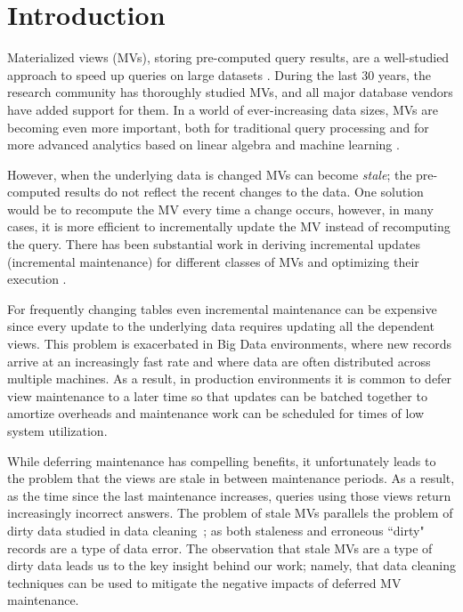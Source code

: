 \vspace{-0.5em}
\section{Introduction}
Materialized views (MVs), storing pre-computed query results, are a well-studied approach to speed up queries on large datasets \cite{LarsonY85, gupta1995maintenance, chirkova2011materialized, halevy2001answering}.
During the last 30 years, the research community has thoroughly studied MVs, and all major database vendors have added support for them.
In a world of ever-increasing data sizes, MVs are becoming even more important, both for traditional query processing and for more advanced analytics based on linear algebra and machine learning \cite{nikolic2014linview, zhang2014mat}.

However, when the underlying data is changed MVs can become \emph{stale}; the pre-computed results do not reflect the recent changes to the data. 
One solution would be to recompute the MV every time a change occurs, however, in many cases, it is more efficient to incrementally update the MV instead of recomputing the query.
There has been substantial work in deriving incremental updates (incremental maintenance) for different classes of MVs and optimizing their execution \cite{chirkova2011materialized}.

For frequently changing tables even incremental maintenance can be expensive since every update to the underlying data requires updating all the dependent views.  
This problem is exacerbated in Big Data environments, where new records arrive at an increasingly fast rate and where data are often 
distributed across multiple machines.  
As a result, in production environments it is common to defer view maintenance to a later time \cite{chirkova2011materialized, zhou2007lazy, DBLP:conf/sigmod/ColbyGLMT96} so that updates can be batched together to amortize overheads and maintenance work can be scheduled for times of low system utilization.  

While deferring maintenance has compelling benefits, it unfortunately leads to the problem that the views are stale in between maintenance periods. 
As a result, as the time since the last maintenance increases, queries using those views return increasingly incorrect answers.
The problem of stale MVs parallels the problem of dirty data studied in data cleaning~\cite{rahm2000data}; as both staleness and erroneous ``dirty" records are a type of data error.
The observation that stale MVs are a type of dirty data leads us to the key insight behind our work; namely, that data cleaning techniques can be used to mitigate the negative impacts of deferred MV maintenance.

